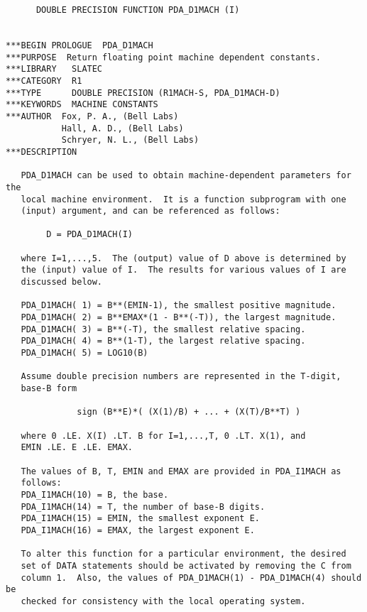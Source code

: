 \begin{verbatim}
      DOUBLE PRECISION FUNCTION PDA_D1MACH (I)


***BEGIN PROLOGUE  PDA_D1MACH
***PURPOSE  Return floating point machine dependent constants.
***LIBRARY   SLATEC
***CATEGORY  R1
***TYPE      DOUBLE PRECISION (R1MACH-S, PDA_D1MACH-D)
***KEYWORDS  MACHINE CONSTANTS
***AUTHOR  Fox, P. A., (Bell Labs)
           Hall, A. D., (Bell Labs)
           Schryer, N. L., (Bell Labs)
***DESCRIPTION

   PDA_D1MACH can be used to obtain machine-dependent parameters for the
   local machine environment.  It is a function subprogram with one
   (input) argument, and can be referenced as follows:

        D = PDA_D1MACH(I)

   where I=1,...,5.  The (output) value of D above is determined by
   the (input) value of I.  The results for various values of I are
   discussed below.

   PDA_D1MACH( 1) = B**(EMIN-1), the smallest positive magnitude.
   PDA_D1MACH( 2) = B**EMAX*(1 - B**(-T)), the largest magnitude.
   PDA_D1MACH( 3) = B**(-T), the smallest relative spacing.
   PDA_D1MACH( 4) = B**(1-T), the largest relative spacing.
   PDA_D1MACH( 5) = LOG10(B)

   Assume double precision numbers are represented in the T-digit,
   base-B form

              sign (B**E)*( (X(1)/B) + ... + (X(T)/B**T) )

   where 0 .LE. X(I) .LT. B for I=1,...,T, 0 .LT. X(1), and
   EMIN .LE. E .LE. EMAX.

   The values of B, T, EMIN and EMAX are provided in PDA_I1MACH as
   follows:
   PDA_I1MACH(10) = B, the base.
   PDA_I1MACH(14) = T, the number of base-B digits.
   PDA_I1MACH(15) = EMIN, the smallest exponent E.
   PDA_I1MACH(16) = EMAX, the largest exponent E.

   To alter this function for a particular environment, the desired
   set of DATA statements should be activated by removing the C from
   column 1.  Also, the values of PDA_D1MACH(1) - PDA_D1MACH(4) should be
   checked for consistency with the local operating system.


\end{verbatim}
